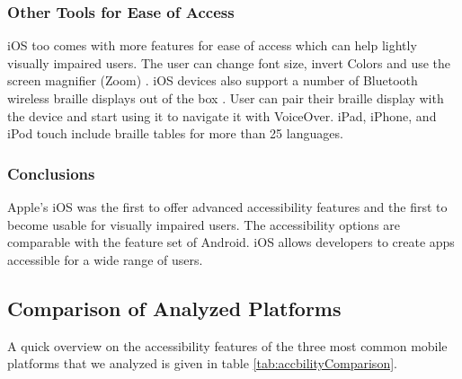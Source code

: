 \subsubsection{Other Tools for Ease of Access}
iOS too comes with more features for ease of access which can help lightly visually impaired users. The user can change font size, invert Colors and use the screen magnifier (Zoom) \cite{iosAccbility}.
iOS devices also support a number of Bluetooth wireless braille displays out of the box \cite{iosAccbility}. User can pair their braille display with the device and start using it to navigate it with VoiceOver. iPad, iPhone, and iPod touch include braille tables for more than 25 languages.

\subsubsection{Conclusions}
Apple's iOS was the first to offer advanced accessibility features and the first to become usable for visually impaired users. The accessibility options are comparable with the  feature set of Android. iOS allows developers to create apps accessible for a wide range of users.

\subsection{Comparison of Analyzed Platforms}
A quick overview on the accessibility features of the three most common mobile platforms that we analyzed is given in table \ref{tab:accbilityComparison}.




